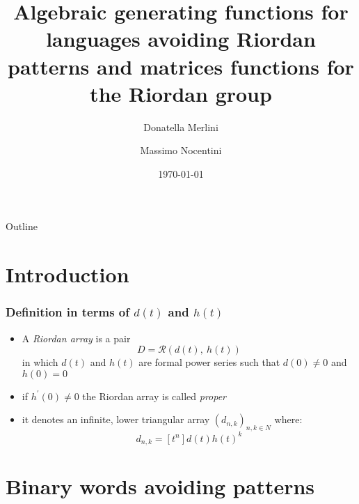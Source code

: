 \documentclass{beamer}
\title{Algebraic generating functions for languages  avoiding Riordan patterns and 
matrices functions for the Riordan group}
\author[Merlini, Nocentini] %
{Donatella Merlini \and Massimo Nocentini}
\institute[Universities of Somewhere and Elsewhere] %
{
  Dipartimento di Statistica, Informatica, Applicazioni \\
  University of Florence, Italy
}
\date{\today}
\begin{document}
\begin{frame}
  \titlepage
\end{frame}

\begin{frame}{Outline}
  \tableofcontents
\end{frame}




\section{Introduction}

\begin{frame}
\frametitle{Definition in terms of $d(t)$ and $h(t)$}
\begin{itemize}
\item A \emph{Riordan array} is a pair
$$D=\mathcal{R}(d(t),\ h(t))$$
in which $d(t)$ and $h(t)$ are formal power series such that $d(0)\neq 0$ and  $h(0)= 0$
\item if $h^\prime(0)\neq 0$ the Riordan array is called \emph{proper}
\item it denotes an infinite, lower triangular array $(d_{n,k})_{n,k\in N}$ where:
$$d_{n,k}=[t^n]d(t)h(t)^k$$
\end{itemize}
\end{frame}


\section{Binary words avoiding patterns}
\end{document}
